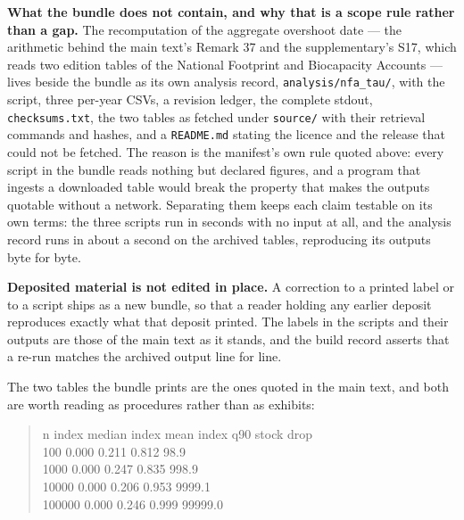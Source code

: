\documentclass[11pt]{article}
\begin{document}
\textbf{What the bundle does not contain, and why that is a scope rule rather than a gap.} The recomputation of the aggregate overshoot date --- the arithmetic behind the main text's Remark 37 and the supplementary's S17, which reads two edition tables of the National Footprint and Biocapacity Accounts --- lives beside the bundle as its own analysis record, \texttt{analysis/nfa\_tau/}, with the script, three per-year CSVs, a revision ledger, the complete stdout, \texttt{checksums.txt}, the two tables as fetched under \texttt{source/} with their retrieval commands and hashes, and a \texttt{README.md} stating the licence and the release that could not be fetched. The reason is the manifest's own rule quoted above: every script in the bundle reads nothing but declared figures, and a program that ingests a downloaded table would break the property that makes the outputs quotable without a network. Separating them keeps each claim testable on its own terms: the three scripts run in seconds with no input at all, and the analysis record runs in about a second on the archived tables, reproducing its outputs byte for byte.

\textbf{Deposited material is not edited in place.} A correction to a printed label or to a script ships as a new bundle, so that a reader holding any earlier deposit reproduces exactly what that deposit printed. The labels in the scripts and their outputs are those of the main text as it stands, and the build record asserts that a re-run matches the archived output line for line.

The two tables the bundle prints are the ones quoted in the main text, and both are worth reading as procedures rather than as exhibits:

\begin{quote}\ttfamily\footnotesize\raggedright\setlength{\parskip}{0pt}
       n   index median     index mean      index q90     stock drop\\
     100          0.000          0.211          0.812           98.9\\
    1000          0.000          0.247          0.835          998.9\\
   10000          0.000          0.206          0.953         9999.1\\
  100000          0.000          0.246          0.999        99999.0
\end{quote}
\end{document}
